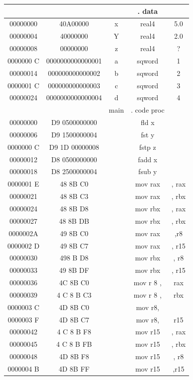 \documentclass[10pt]{book}
\begin{document}
\begin{center}
\begin{tabular}{|c|c|c|c|c|}
\hline
 &  &  & . data &  \\
\hline
00000000 & 40A00000 & x & real4 & 5.0 \\
\hline
00000004 & 40000000 & Y & real4 & 2.0 \\
\hline
00000008 & 00000000 & z & real4 & ? \\
\hline
0000000 C & 0000000000000001 & a & sqword & 1 \\
\hline
00000014 & 000000000000002 & b & sqword & 2 \\
\hline
0000001 C & 000000000000003 & c & sqword & 3 \\
\hline
00000024 & 0000000000000004 & d & sqword & 4 \\
\hline
 &  & main & . code proc &  \\
\hline
00000000 & D9 0500000000 &  & fld x &  \\
\hline
00000006 & D9 1500000004 &  & fst y &  \\
\hline
0000000 C & D9 1D 00000008 &  & fstp z &  \\
\hline
00000012 & D8 0500000000 &  & fadd x &  \\
\hline
00000018 & D8 2500000004 &  & fsub y &  \\
\hline
0000001 E & 48 8B C0 &  & mov rax & , rax \\
\hline
00000021 & 48 8B C3 &  & mov rax & , rbx \\
\hline
00000024 & 48 8B D8 &  & mov rbx & , rax \\
\hline
00000027 & 48 8B DB &  & mov rbx & , rbx \\
\hline
0000002A & 49 8B C0 &  & mov rax & ,r8 \\
\hline
0000002 D & 49 8B C7 &  & mov rax & , r15 \\
\hline
00000030 & 498 B D8 &  & mov rbx & , r8 \\
\hline
00000033 & 49 8B DF &  & mov rbx & , r15 \\
\hline
00000036 & 4C 8B C0 &  & mov r 8 , & rax \\
\hline
00000039 & 4 C 8 B C3 &  & mov r 8 , & rbx \\
\hline
0000003 C & 4D 8B C0 &  & mov r8, &  \\
\hline
0000003 F & 4D 8B C7 &  & mov r8, & r15 \\
\hline
00000042 & 4 C 8 B F8 &  & mov r15 & , rax \\
\hline
00000045 & 4 C 8 B FB &  & mov r15 & , rbx \\
\hline
00000048 & 4D 8B F8 &  & mov r15 & , r8 \\
\hline
0000004 B & 4D 8B FF &  & mov r15 & ,r15 \\
\hline
\end{tabular}
\end{center}
\end{document}
